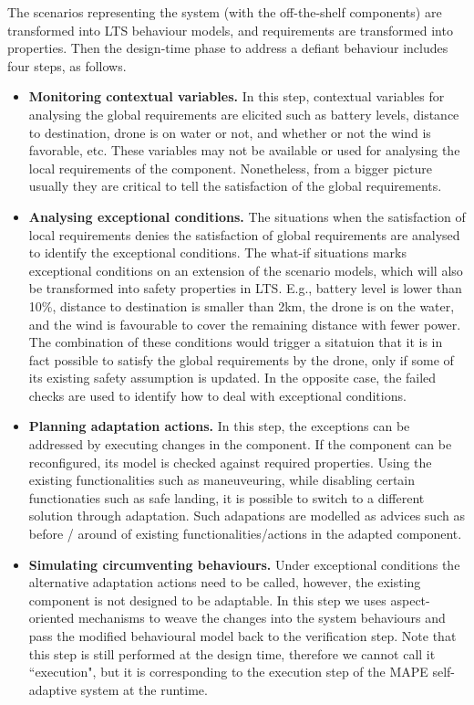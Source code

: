 The scenarios representing the system (with the off-the-shelf components) are transformed into LTS behaviour models, and requirements are transformed into properties. Then the design-time phase to address a defiant behaviour includes four steps, as follows. 
\begin{itemize}
\item {\bf Monitoring contextual variables.} In this step, contextual variables for analysing the global requirements are elicited such as battery levels, distance to destination, drone is on water or not, and whether or not the wind is favorable, etc.  These variables may not be available or used for analysing the local requirements of the component. Nonetheless, from a bigger picture usually they are critical to tell the satisfaction of the global requirements. 
\item {\bf Analysing exceptional conditions.} 
The situations when the satisfaction of local requirements denies the satisfaction of global requirements are analysed to identify the exceptional conditions. The what-if situations marks exceptional conditions on an extension of the scenario models, which will also be transformed into safety properties in LTS.  E.g., battery level is lower than 10\%, distance to destination is smaller than 2km, the drone is on the water, and the wind is favourable to cover the remaining distance with fewer power. The combination of these conditions would trigger a sitatuion that it is in fact possible to satisfy the global requirements by the drone, only if some of its existing safety assumption is updated. In the opposite case, the failed checks are used to identify how to deal with exceptional conditions. %
\item {\bf Planning adaptation actions.} In this step, the exceptions can be addressed by executing changes in the component. If the component can be reconfigured, its model is checked against required properties. Using the existing functionalities such as maneuveuring, while disabling certain functionaties such as safe landing, it is possible to switch to a different solution through adaptation. Such adapations are modelled as advices such as before / around of existing functionalities/actions in the adapted component.  
\item {\bf Simulating circumventing behaviours.} Under exceptional conditions the alternative adaptation actions need to be called, however, the existing component is not designed to be adaptable. In this step we uses aspect-oriented mechanisms to weave the changes into the system behaviours and pass the modified behavioural model back to the verification step. Note that this step is still performed at the design time, therefore we cannot call it ``execution", but it is corresponding to the execution step of the MAPE self-adaptive system at the runtime.
\end{itemize}

